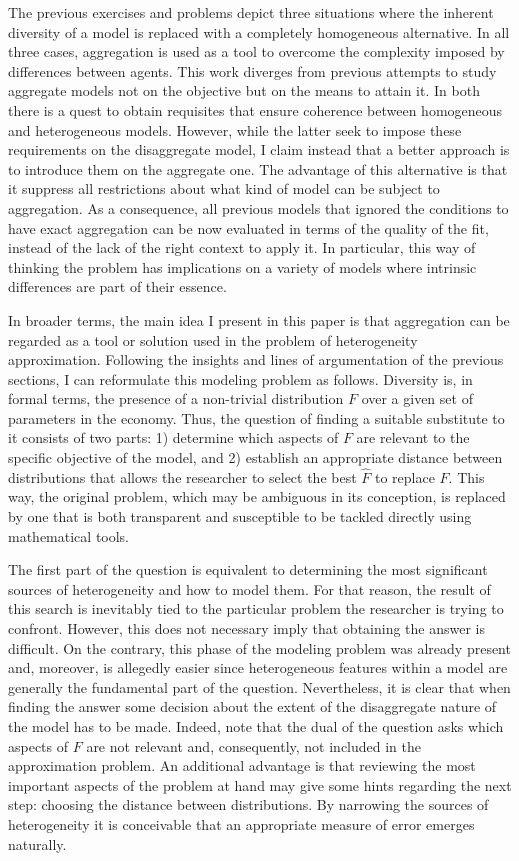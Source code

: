 \documentclass[english, a4paper, 12pt]{article}
\begin{document}
The previous exercises and problems depict three situations where the inherent diversity of a model is replaced with a completely homogeneous alternative. In all three cases, aggregation is used as a tool to overcome the complexity imposed by differences between agents. This work diverges from previous attempts to study aggregate models not on the objective but on the means to attain it. In both there is a quest to obtain requisites that ensure coherence between homogeneous and heterogeneous models. However, while the latter seek to impose these requirements on the disaggregate model, I claim instead that a better approach is to introduce them on the aggregate one. The advantage of this alternative is that it suppress all restrictions about what kind of model can be subject to aggregation. As a consequence, all previous models that ignored the conditions to have exact aggregation can be now evaluated in terms of the quality of the fit, instead of the lack of the right context to apply it. In particular, this way of thinking the problem has implications on a variety of models where intrinsic differences are part of their essence.

In broader terms, the main idea I present in this paper is that aggregation can be regarded as a tool or solution used in the problem of heterogeneity approximation. Following the insights and lines of argumentation of the previous sections, I can reformulate this modeling problem as follows. Diversity is, in formal terms, the presence of a non-trivial distribution $F$ over a given set of parameters in the economy. Thus, the question of finding a suitable substitute to it consists of two parts: 1) determine which aspects of $F$ are relevant to the specific objective of the model, and 2) establish an appropriate distance between distributions that allows the researcher to select the best $\hat{F}$ to replace $F$. This way, the original problem, which may be ambiguous in its conception, is replaced by one that is both transparent and susceptible to be tackled directly using mathematical tools.

The first part of the question is equivalent to determining the most significant sources of heterogeneity and how to model them. For that reason, the result of this search is inevitably tied to the particular problem the researcher is trying to confront. However, this does not necessary imply that obtaining the answer is difficult. On the contrary, this phase of the modeling problem was already present and, moreover, is allegedly easier since heterogeneous features within a model are generally the fundamental part of the question. Nevertheless, it is clear that when finding the answer some decision about the extent of the disaggregate nature of the model has to be made. Indeed, note that the dual of the question asks which aspects of $F$ are not relevant and, consequently, not included in the approximation problem. An additional advantage is that reviewing the most important aspects of the problem at hand may give some hints regarding the next step: choosing the distance between distributions. By narrowing the sources of heterogeneity it is conceivable that an appropriate measure of error emerges naturally.
\end{document}
